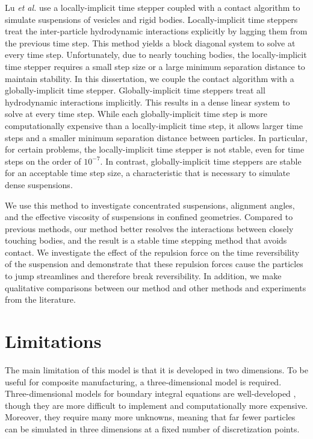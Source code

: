 Lu \emph{et al.} \cite{Lu2017} use a locally-implicit time stepper coupled with a contact algorithm to simulate suspensions of vesicles and rigid bodies. Locally-implicit time steppers treat the inter-particle hydrodynamic interactions explicitly by lagging them from the previous time step. This method yields a block diagonal system to solve at every time step. Unfortunately, due to nearly touching bodies, the locally-implicit time stepper requires a small step size or a large minimum separation distance to maintain stability. In this dissertation, we couple the contact algorithm \cite{Lu2017} with a globally-implicit time stepper. Globally-implicit time steppers treat all hydrodynamic interactions implicitly. This results in a dense linear system to solve at every time step. While each globally-implicit time step is more computationally expensive than a locally-implicit time step, it allows larger time steps and a smaller minimum separation distance between particles. In particular, for certain problems, the locally-implicit time stepper is not stable, even for time steps on the order of $10^{-7}$. In contrast, globally-implicit time steppers are stable for an acceptable time step size, a characteristic that is necessary to simulate dense suspensions.

We use this method to investigate concentrated suspensions, alignment angles, and the effective viscosity of suspensions in confined geometries. Compared to previous methods, our method better resolves the interactions between closely touching bodies, and the result is a stable time stepping method that avoids contact. We investigate the effect of the repulsion force on the time reversibility of the suspension and demonstrate that these repulsion forces cause the particles to jump streamlines and therefore break reversibility. In addition, we make qualitative comparisons between our method and other methods and experiments from the literature. 

\section{Limitations}

The main limitation of this model is that it is  developed in two dimensions. To be useful for composite manufacturing, a three-dimensional model is required. Three-dimensional models for boundary integral equations are well-developed \cite{Mammoli2006, Corona2017 }, though they are more difficult to implement and computationally more expensive. Moreover, they require many more unknowns, meaning that far fewer particles can be simulated in three dimensions at a fixed number of discretization points. 


